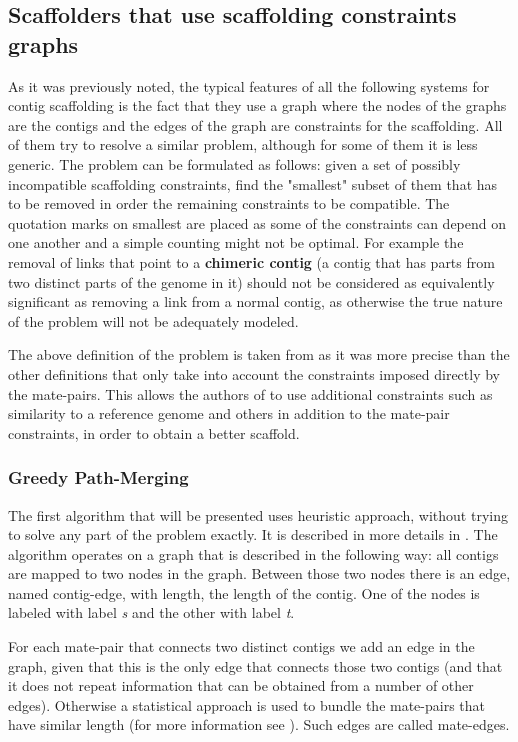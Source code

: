 \documentclass[11pt]{article}
\begin{document}
\subsection{Scaffolders that use scaffolding constraints graphs} %
\label{sub:Scaffolders that use scaffolding constraints graphs}
As it was previously noted, the typical features of all the following
systems for contig scaffolding is the fact that they use a graph where the nodes
of the graphs are the contigs and the edges of the graph are constraints for the
scaffolding. All of them try to resolve a similar problem, although for some of
them it is less generic. The problem can be formulated as follows: given a set
of possibly incompatible scaffolding constraints, find the "smallest" subset of
them that has to be removed in order the remaining constraints to be compatible.
The quotation marks on smallest are placed as some of the constraints can depend
on one another and a simple counting might not be optimal. For example the
removal of links that point to a \textbf{chimeric contig} (a contig that has
parts from two distinct parts of the genome in it) should not be considered as
equivalently significant as removing a link from a normal contig, as otherwise
the true nature of the problem will not be adequately modeled.

The above definition of the problem is taken from \cite{grass} as it was more
precise than the other definitions that only take into account the constraints
imposed directly by the mate-pairs. This allows the authors of \cite{grass} to
use additional constraints such as similarity to a reference genome and others
in addition to the mate-pair constraints, in order to obtain a better scaffold.

\subsubsection{Greedy Path-Merging} %
\label{ssub:Greedy Path-Merging}
The first algorithm that will be presented uses heuristic approach, without
trying to solve any part of the problem exactly. It is described in more details
in \cite{greedy-path-merging}. The algorithm operates on a graph that is
described in the following way: all contigs are mapped to two nodes in the
graph. Between those two nodes there is an edge, named contig-edge, with length,
the length of the contig. One of the nodes is labeled with label \emph{s} and
the other with label \emph{t}.

For each mate-pair that connects two distinct contigs we add an edge in the
graph, given that this is the only edge that connects those two contigs (and that
it does not repeat information that can be obtained from a number of other
edges). Otherwise a statistical approach is used to bundle the mate-pairs that
have similar length (for more information see \cite{greedy-path-merging}). Such
edges are called mate-edges.
\end{document}
